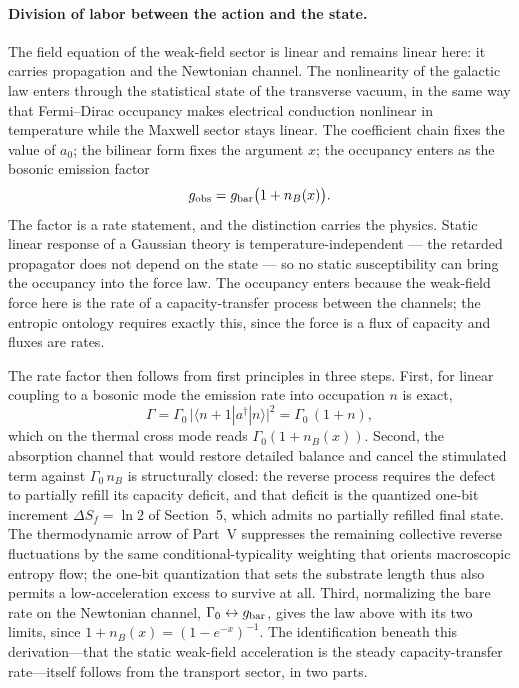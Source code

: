 \documentclass[11pt]{article}
\begin{document}
\paragraph{Division of labor between the action and the state.}
The field equation of the weak-field sector is linear and remains linear here: it carries propagation and the Newtonian channel. The nonlinearity of the galactic law enters through the statistical state of the transverse vacuum, in the same way that Fermi--Dirac occupancy makes electrical conduction nonlinear in temperature while the Maxwell sector stays linear. The coefficient chain fixes the value of $a_0$; the bilinear form fixes the argument $x$; the occupancy enters as the bosonic emission factor
\[
g_{\rm obs}=g_{\rm bar}\bigl(1+n_B(x)\bigr).
\]
The factor is a rate statement, and the distinction carries the physics. Static linear response of a Gaussian theory is temperature-independent --- the retarded propagator does not depend on the state --- so no static susceptibility can bring the occupancy into the force law. The occupancy enters because the weak-field force here is the rate of a capacity-transfer process between the channels; the entropic ontology requires exactly this, since the force is a flux of capacity and fluxes are rates.

The rate factor then follows from first principles in three steps. First, for linear coupling to a bosonic mode the emission rate into occupation $n$ is exact,
\[
\Gamma=\Gamma_0\,\bigl|\langle n{+}1|a^\dagger|n\rangle\bigr|^2=\Gamma_0\,(1+n),
\]
which on the thermal cross mode reads $\Gamma_0(1+n_B(x))$. Second, the absorption channel that would restore detailed balance and cancel the stimulated term against $\Gamma_0\,n_B$ is structurally closed: the reverse process requires the defect to partially refill its capacity deficit, and that deficit is the quantized one-bit increment $\Delta S_f=\ln2$ of Section~5, which admits no partially refilled final state. The thermodynamic arrow of Part~V suppresses the remaining collective reverse fluctuations by the same conditional-typicality weighting that orients macroscopic entropy flow; the one-bit quantization that sets the substrate length thus also permits a low-acceleration excess to survive at all. Third, normalizing the bare rate on the Newtonian channel, $\Gamma_0\leftrightarrow g_{\rm bar}$, gives the law above with its two limits, since $1+n_B(x)=(1-e^{-x})^{-1}$. The identification beneath this derivation---that the static weak-field acceleration is the steady capacity-transfer rate---itself follows from the transport sector, in two parts.
\end{document}
